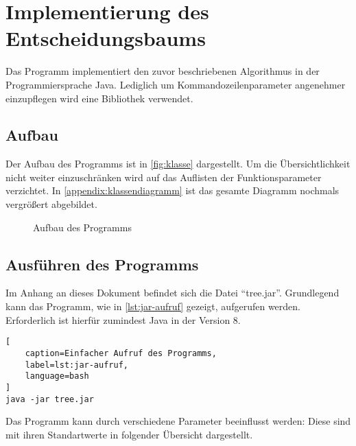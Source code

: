\section{Implementierung des Entscheidungsbaums}\label{sec:implementierung}
Das Programm implementiert den zuvor beschriebenen Algorithmus in der Programmiersprache Java.
Lediglich um Kommandozeilenparameter angenehmer einzupflegen wird eine Bibliothek verwendet.

\subsection{Aufbau}
Der Aufbau des Programms ist in \autoref{fig:klasse} dargestellt.
Um die Übersichtlichkeit nicht weiter einzuschränken wird auf das Auflisten der Funktionsparameter verzichtet.
In \autoref{appendix:klassendiagramm} ist das gesamte Diagramm nochmals vergrößert abgebildet.

\begin{figure}[ht!]
    \centering
    \resizebox{\textwidth}{!}{
        
    }
    \caption{Aufbau des Programms}
    \label{fig:klasse}
\end{figure}

\subsection{Ausführen des Programms}
Im Anhang an dieses Dokument befindet sich die Datei \enquote{tree.jar}.
Grundlegend kann das Programm, wie in \autoref{lst:jar-aufruf} gezeigt, aufgerufen werden.
Erforderlich ist hierfür zumindest Java in der Version 8.

\begin{lstlisting}[
    caption=Einfacher Aufruf des Programms,
    label=lst:jar-aufruf,
    language=bash
]
java -jar tree.jar
\end{lstlisting}

Das Programm kann durch verschiedene Parameter beeinflusst werden:
Diese sind mit ihren Standartwerte in folgender Übersicht dargestellt.

